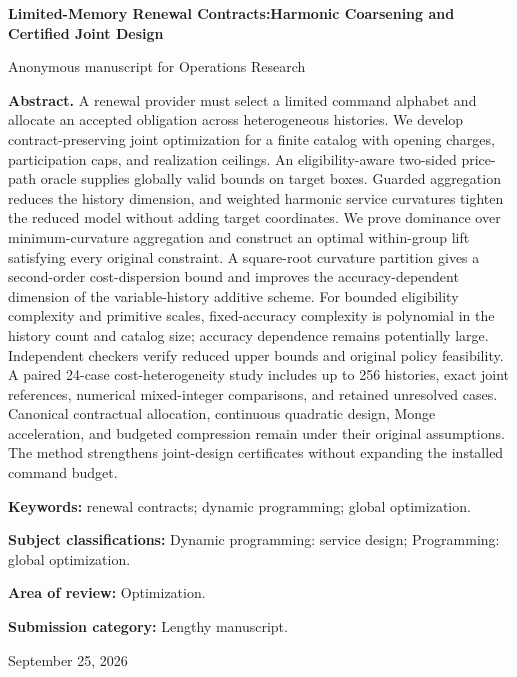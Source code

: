 \documentclass[11pt,letterpaper]{article}
\theoremstyle{definition}\newtheorem{assumption}[theorem]{Assumption}
\begin{document}
\hypersetup{pageanchor=false}
\begin{titlepage}\centering
{\Large\bfseries Limited-Memory Renewal Contracts:\newline Harmonic Coarsening and Certified Joint Design\par}
\vspace{.3in}Anonymous manuscript for Operations Research\par\vspace{.2in}
\begin{minipage}{\textwidth}\textbf{Abstract.} A renewal provider must select a limited command alphabet and allocate an accepted obligation across heterogeneous histories. We develop contract-preserving joint optimization for a finite catalog with opening charges, participation caps, and realization ceilings. An eligibility-aware two-sided price-path oracle supplies globally valid bounds on target boxes. Guarded aggregation reduces the history dimension, and weighted harmonic service curvatures tighten the reduced model without adding target coordinates. We prove dominance over minimum-curvature aggregation and construct an optimal within-group lift satisfying every original constraint. A square-root curvature partition gives a second-order cost-dispersion bound and improves the accuracy-dependent dimension of the variable-history additive scheme. For bounded eligibility complexity and primitive scales, fixed-accuracy complexity is polynomial in the history count and catalog size; accuracy dependence remains potentially large. Independent checkers verify reduced upper bounds and original policy feasibility. A paired 24-case cost-heterogeneity study includes up to 256 histories, exact joint references, numerical mixed-integer comparisons, and retained unresolved cases. Canonical contractual allocation, continuous quadratic design, Monge acceleration, and budgeted compression remain under their original assumptions. The method strengthens joint-design certificates without expanding the installed command budget.
\par\vspace{.15in}\textbf{Keywords:} renewal contracts; dynamic programming; global optimization.
\par\vspace{.1in}\textbf{Subject classifications:} Dynamic programming: service design; Programming: global optimization.
\par\vspace{.1in}\textbf{Area of review:} Optimization.
\par\vspace{.1in}\textbf{Submission category:} Lengthy manuscript.
\end{minipage}\vfill September 25, 2026\end{titlepage}
\end{document}
